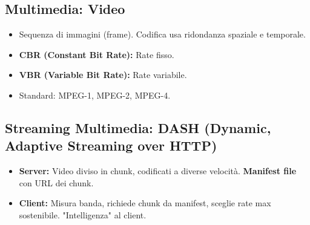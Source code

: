 \documentclass{article}
\begin{document}
\subsection{Multimedia: Video}
\begin{itemize}
    \item Sequenza di immagini (frame). Codifica usa ridondanza spaziale e temporale.
    \item \textbf{CBR (Constant Bit Rate):} Rate fisso.
    \item \textbf{VBR (Variable Bit Rate):} Rate variabile.
    \item Standard: MPEG-1, MPEG-2, MPEG-4.
\end{itemize}

\subsection{Streaming Multimedia: DASH (Dynamic, Adaptive Streaming over HTTP)}
\begin{itemize}
    \item \textbf{Server:} Video diviso in chunk, codificati a diverse velocità. \textbf{Manifest file} con URL dei chunk.
    \item \textbf{Client:} Misura banda, richiede chunk da manifest, sceglie rate max sostenibile. "Intelligenza" al client.
\end{itemize}
\end{document}
